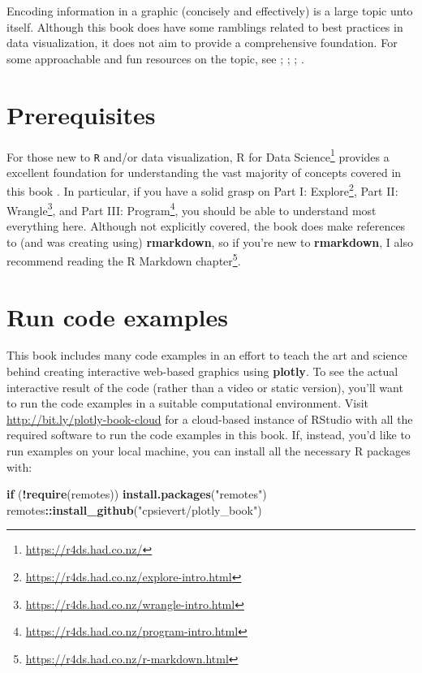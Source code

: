 \documentclass[
  12pt,
]{krantz}
\newenvironment{Shaded}{\begin{snugshade}}{\end{snugshade}}
\newcommand{\ControlFlowTok}[1]{\textcolor[rgb]{0.13,0.29,0.53}{\textbf{#1}}}
\newcommand{\KeywordTok}[1]{\textcolor[rgb]{0.13,0.29,0.53}{\textbf{#1}}}
\newcommand{\NormalTok}[1]{#1}
\newcommand{\OperatorTok}[1]{\textcolor[rgb]{0.81,0.36,0.00}{\textbf{#1}}}
\newcommand{\StringTok}[1]{\textcolor[rgb]{0.31,0.60,0.02}{#1}}
\renewcommand{\href}[2]{#2\footnote{\url{#1}}}
\begin{document}
Encoding information in a graphic (concisely and effectively) is a large topic unto itself. Although this book does have some ramblings related to best practices in data visualization, it does not aim to provide a comprehensive foundation. For some approachable and fun resources on the topic, see \citep{tufte-dataviz}; \citep{yau-dataviz}; \citep{healey-dataviz}; \citep{claus-dataviz}.

\hypertarget{prerequisites}{%
\section{Prerequisites}\label{prerequisites}}

For those new to \texttt{R} and/or data visualization, \href{https://r4ds.had.co.nz/}{R for Data Science} provides a excellent foundation for understanding the vast majority of concepts covered in this book \citep{r4ds}. In particular, if you have a solid grasp on \href{https://r4ds.had.co.nz/explore-intro.html}{Part I: Explore}, \href{https://r4ds.had.co.nz/wrangle-intro.html}{Part II: Wrangle}, and \href{https://r4ds.had.co.nz/program-intro.html}{Part III: Program}, you should be able to understand most everything here. Although not explicitly covered, the book does make references to (and was creating using) \textbf{rmarkdown}, so if you're new to \textbf{rmarkdown}, I also recommend reading the \href{https://r4ds.had.co.nz/r-markdown.html}{R Markdown chapter}.

\hypertarget{run-code-examples}{%
\section{Run code examples}\label{run-code-examples}}

This book includes many code examples in an effort to teach the art and science behind creating interactive web-based graphics using \textbf{plotly}. To see the actual interactive result of the code (rather than a video or static version), you'll want to run the code examples in a suitable computational environment. Visit \url{http://bit.ly/plotly-book-cloud} for a cloud-based instance of RStudio with all the required software to run the code examples in this book. If, instead, you'd like to run examples on your local machine, you can install all the necessary R packages with:

\begin{Shaded}
\begin{Highlighting}[]
\ControlFlowTok{if}\NormalTok{ (}\OperatorTok{!}\KeywordTok{require}\NormalTok{(remotes)) }\KeywordTok{install.packages}\NormalTok{(}\StringTok{"remotes"}\NormalTok{)}
\NormalTok{remotes}\OperatorTok{::}\KeywordTok{install_github}\NormalTok{(}\StringTok{"cpsievert/plotly_book"}\NormalTok{)}
\end{Highlighting}
\end{Shaded}
\end{document}
